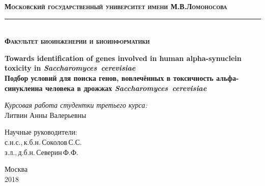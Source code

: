 \begin{titlepage}

\newcommand{\HRule}{\rule{\linewidth}{0.3mm}} %

\center

\textbf{\textsc{\Large Московский государственный университет} \textsc{\large имени }\textsc{\Large М.В.Ломоносова}}
\\[0.3cm] 
\HRule 
\\[0.3cm]
\textbf{\textsc{\large Факультет биоинженерии и биоинформатики}}
\\[4.0cm]

\begin{spacing}{1.4}
{ \LARGE \bfseries  Towards identification of genes involved in human alpha-synuclein toxicity in \emph{Saccharomyces~cerevisiae}} \\[1.0cm]


{\LARGE \bfseries Подбор условий для поиска генов, вовлечённых в токсичность альфа-синуклеина человека в дрожжах \emph{Saccharomyces~cerevisiae}} \\[2.0cm]
\end{spacing}
 
 
\Large \emph{Курсовая работа студентки третьего курса:}\\
Литвин Анны Валерьевны
\\[3cm]



\begin{flushright} \large
Научные руководители: \\
с.н.с.,\,к.б.н.\,Соколов\,С.С. \\
з.л.,\,д.б.н.\,Северин\,Ф.Ф.
\end{flushright}




\vfill

{\large Москва \\ 2018}


\end{titlepage}
